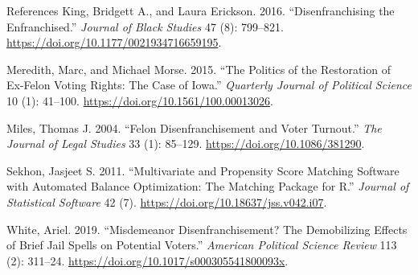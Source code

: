 \documentclass[
  ignorenonframetext,
]{beamer}
\newlength{\cslhangindent}
\newenvironment{cslreferences}%
  {\setlength{\parindent}{0pt}%
  \everypar{\setlength{\hangindent}{\cslhangindent}}\ignorespaces}%
  {\par}
\begin{document}
\begin{frame}{References}
\begin{cslreferences}
\leavevmode\hypertarget{ref-King2016}{}%
King, Bridgett A., and Laura Erickson. 2016. ``Disenfranchising the
Enfranchised.'' \emph{Journal of Black Studies} 47 (8): 799--821.
\url{https://doi.org/10.1177/0021934716659195}.

\leavevmode\hypertarget{ref-Meredith2015}{}%
Meredith, Marc, and Michael Morse. 2015. ``The Politics of the
Restoration of Ex-Felon Voting Rights: The Case of Iowa.''
\emph{Quarterly Journal of Political Science} 10 (1): 41--100.
\url{https://doi.org/10.1561/100.00013026}.

\leavevmode\hypertarget{ref-Miles2004}{}%
Miles, Thomas J. 2004. ``Felon Disenfranchisement and Voter Turnout.''
\emph{The Journal of Legal Studies} 33 (1): 85--129.
\url{https://doi.org/10.1086/381290}.

\leavevmode\hypertarget{ref-Sekhon2011}{}%
Sekhon, Jasjeet S. 2011. ``Multivariate and Propensity Score Matching
Software with Automated Balance Optimization: The Matching Package for
R.'' \emph{Journal of Statistical Software} 42 (7).
\url{https://doi.org/10.18637/jss.v042.i07}.

\leavevmode\hypertarget{ref-White2019}{}%
White, Ariel. 2019. ``Misdemeanor Disenfranchisement? The Demobilizing
Effects of Brief Jail Spells on Potential Voters.'' \emph{American
Political Science Review} 113 (2): 311--24.
\url{https://doi.org/10.1017/s000305541800093x}.
\end{cslreferences}
\end{frame}
\end{document}
